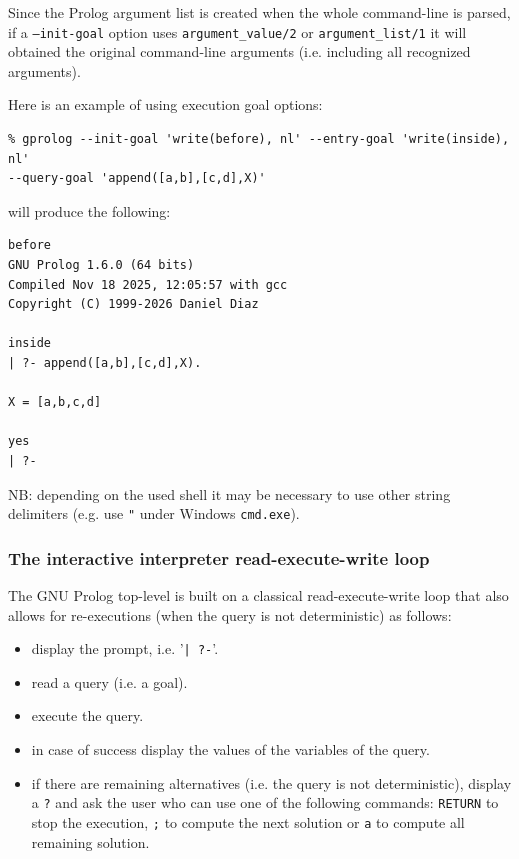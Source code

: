 Since the Prolog argument list is created when the whole command-line is
parsed, if a \texttt{--init-goal} option uses \texttt{argument\_value/2} or
\texttt{argument\_list/1} it will obtained the original command-line
arguments (i.e. including all recognized arguments).

Here is an example of using execution goal options:

\begin{Code}
\begin{verbatim}
% gprolog --init-goal 'write(before), nl' --entry-goal 'write(inside), nl'
--query-goal 'append([a,b],[c,d],X)'
\end{verbatim}
\end{Code}

will produce the following:

\begin{Code}
\begin{verbatim}
before
GNU Prolog 1.6.0 (64 bits)
Compiled Nov 18 2025, 12:05:57 with gcc
Copyright (C) 1999-2026 Daniel Diaz

inside
| ?- append([a,b],[c,d],X).

X = [a,b,c,d]

yes
| ?-
\end{verbatim}
\end{Code}

NB: depending on the used shell it may be necessary to use other string
delimiters (e.g. use \texttt{"} under Windows \texttt{cmd.exe}).

\subsubsection{The interactive interpreter read-execute-write loop}
The GNU Prolog top-level is built on a classical read-execute-write loop that
also allows for re-executions (when the query is not deterministic) as
follows:

\begin{itemize}

\item display the prompt, i.e. '\texttt{| ?-}'.

\item read a query (i.e. a goal).

\item execute the query.

\item in case of success display the values of the variables of the query.

\item if there are remaining alternatives (i.e. the query is not
deterministic), display a \texttt{?} and ask the user who can use one of the
following commands: \texttt{RETURN} to stop the execution, \texttt{;} to
compute the next solution or \texttt{a} to compute all remaining solution.

\end{itemize}

